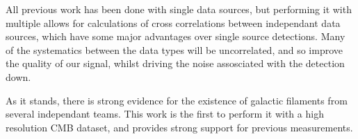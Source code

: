 \par All previous work has been done with single data sources, but performing it with multiple allows for calculations of cross correlations between independant data sources, which have some major advantages over single source detections. Many of the systematics between the data types will be uncorrelated, and so improve the quality of our signal, whilst driving the noise assosciated with the detection down. 

\par As it stands, there is strong evidence for the existence of galactic filaments from several independant teams. This work is the first to perform it with a high resolution CMB dataset, and provides strong support for previous measurements. 